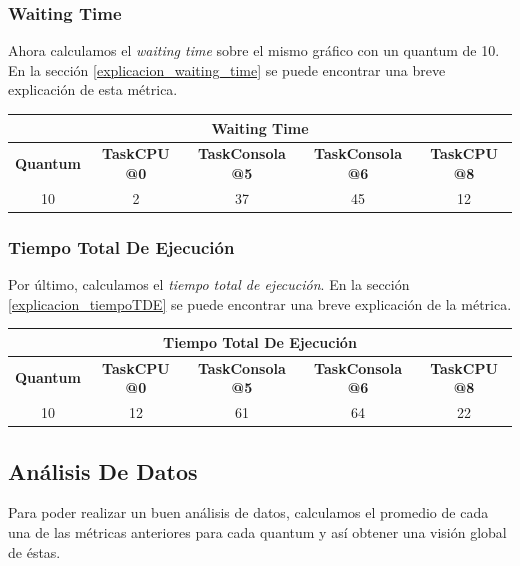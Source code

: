 \subsubsection{Waiting Time}

Ahora calculamos el \emph{waiting time} sobre el mismo gráfico con un quantum de 10. En la sección \ref{explicacion_waiting_time} se puede encontrar una breve explicación de esta métrica.

\begin{center}
	\begin{tabular}{|c|c|c|c|c|}
		\hline
		\multicolumn{5}{|c|}{\large{\textbf{Waiting Time}}} \\
		\hline
		\textbf{Quantum} & \textbf{TaskCPU @0} & \textbf{TaskConsola @5} & \textbf{TaskConsola @6} & \textbf{TaskCPU @8} \\
		\hline
		10 & 2 & 37 & 45 & 12 \\
		\hline
	\end{tabular}
\end{center}

\subsubsection{Tiempo Total De Ejecución}

Por último, calculamos el \emph{tiempo total de ejecución}. En la sección \ref{explicacion_tiempoTDE} se puede encontrar una breve explicación de la métrica.

\begin{center}
	\begin{tabular}{|c|c|c|c|c|}
		\hline
		\multicolumn{5}{|c|}{\large{\textbf{Tiempo Total De Ejecución}}} \\
		\hline
		\textbf{Quantum} & \textbf{TaskCPU @0} & \textbf{TaskConsola @5} & \textbf{TaskConsola @6} & \textbf{TaskCPU @8} \\
		\hline
		10 & 12 & 61 & 64 & 22 \\
		\hline
	\end{tabular}
\end{center}


\subsection{Análisis De Datos}

Para poder realizar un buen análisis de datos, calculamos el promedio de cada una de las métricas anteriores para cada quantum y así obtener una visión global de éstas.

